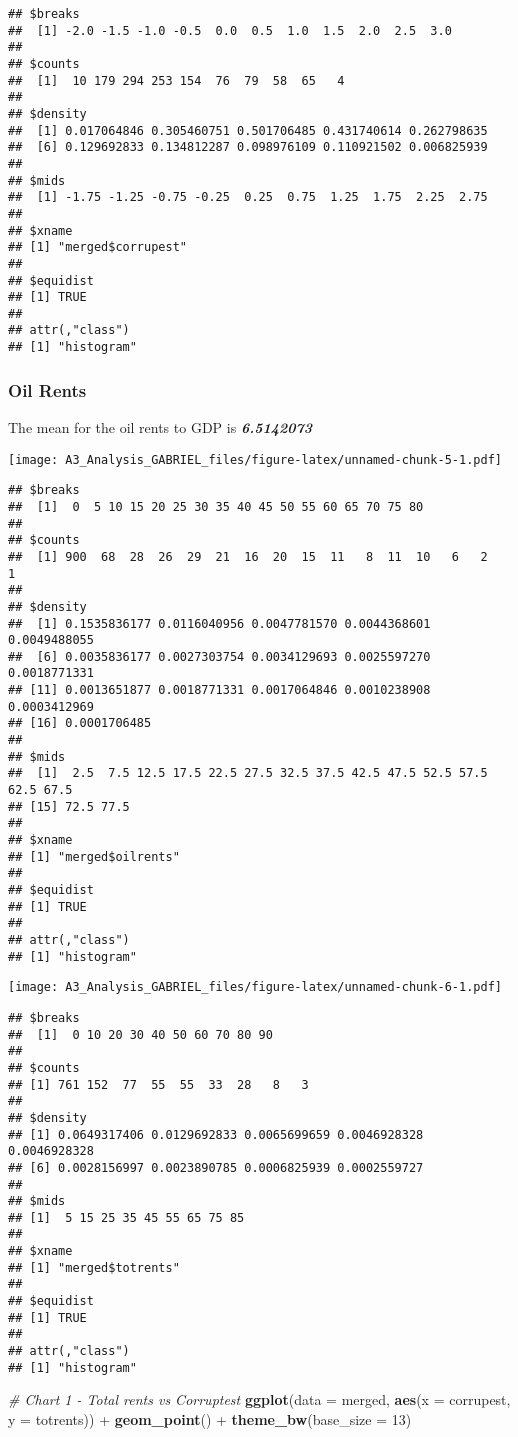 \documentclass[]{article}
\newenvironment{Shaded}{\begin{snugshade}}{\end{snugshade}}
\newcommand{\KeywordTok}[1]{\textcolor[rgb]{0.13,0.29,0.53}{\textbf{{#1}}}}
\newcommand{\DataTypeTok}[1]{\textcolor[rgb]{0.13,0.29,0.53}{{#1}}}
\newcommand{\DecValTok}[1]{\textcolor[rgb]{0.00,0.00,0.81}{{#1}}}
\newcommand{\StringTok}[1]{\textcolor[rgb]{0.31,0.60,0.02}{{#1}}}
\newcommand{\CommentTok}[1]{\textcolor[rgb]{0.56,0.35,0.01}{\textit{{#1}}}}
\newcommand{\NormalTok}[1]{{#1}}
\begin{document}
\begin{verbatim}
## $breaks
##  [1] -2.0 -1.5 -1.0 -0.5  0.0  0.5  1.0  1.5  2.0  2.5  3.0
## 
## $counts
##  [1]  10 179 294 253 154  76  79  58  65   4
## 
## $density
##  [1] 0.017064846 0.305460751 0.501706485 0.431740614 0.262798635
##  [6] 0.129692833 0.134812287 0.098976109 0.110921502 0.006825939
## 
## $mids
##  [1] -1.75 -1.25 -0.75 -0.25  0.25  0.75  1.25  1.75  2.25  2.75
## 
## $xname
## [1] "merged$corrupest"
## 
## $equidist
## [1] TRUE
## 
## attr(,"class")
## [1] "histogram"
\end{verbatim}

\subsubsection{Oil Rents}\label{oil-rents}

The mean for the oil rents to GDP is \textbf{\emph{6.5142073}}

\texttt{[image: A3\_Analysis\_GABRIEL\_files/figure-latex/unnamed-chunk-5-1.pdf]}

\begin{verbatim}
## $breaks
##  [1]  0  5 10 15 20 25 30 35 40 45 50 55 60 65 70 75 80
## 
## $counts
##  [1] 900  68  28  26  29  21  16  20  15  11   8  11  10   6   2   1
## 
## $density
##  [1] 0.1535836177 0.0116040956 0.0047781570 0.0044368601 0.0049488055
##  [6] 0.0035836177 0.0027303754 0.0034129693 0.0025597270 0.0018771331
## [11] 0.0013651877 0.0018771331 0.0017064846 0.0010238908 0.0003412969
## [16] 0.0001706485
## 
## $mids
##  [1]  2.5  7.5 12.5 17.5 22.5 27.5 32.5 37.5 42.5 47.5 52.5 57.5 62.5 67.5
## [15] 72.5 77.5
## 
## $xname
## [1] "merged$oilrents"
## 
## $equidist
## [1] TRUE
## 
## attr(,"class")
## [1] "histogram"
\end{verbatim}

\texttt{[image: A3\_Analysis\_GABRIEL\_files/figure-latex/unnamed-chunk-6-1.pdf]}

\begin{verbatim}
## $breaks
##  [1]  0 10 20 30 40 50 60 70 80 90
## 
## $counts
## [1] 761 152  77  55  55  33  28   8   3
## 
## $density
## [1] 0.0649317406 0.0129692833 0.0065699659 0.0046928328 0.0046928328
## [6] 0.0028156997 0.0023890785 0.0006825939 0.0002559727
## 
## $mids
## [1]  5 15 25 35 45 55 65 75 85
## 
## $xname
## [1] "merged$totrents"
## 
## $equidist
## [1] TRUE
## 
## attr(,"class")
## [1] "histogram"
\end{verbatim}

\begin{Shaded}
\begin{Highlighting}[]
\CommentTok{# Chart 1 - Total rents vs Corruptest}
\KeywordTok{ggplot}\NormalTok{(}\DataTypeTok{data =} \NormalTok{merged, }\KeywordTok{aes}\NormalTok{(}\DataTypeTok{x =} \NormalTok{corrupest,}
        \DataTypeTok{y =} \NormalTok{totrents)) +}\StringTok{ }\KeywordTok{geom_point}\NormalTok{() +}\StringTok{ }\KeywordTok{theme_bw}\NormalTok{(}\DataTypeTok{base_size =} \DecValTok{13}\NormalTok{)}
\end{Highlighting}
\end{Shaded}
\end{document}
